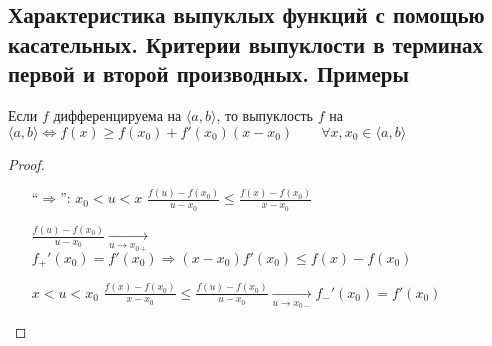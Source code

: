 \subsection{Характеристика выпуклых функций с помощью касательных. Критерии выпуклости в терминах первой и второй производных. Примеры \href{https://youtu.be/CAxh8kYEOlQ?t=6210}{\Walley}}
\begin{theorem-non}
    Если $f$ дифференцируема на $\langle a, b \rangle$, то выпуклость $f$ на $\langle a, b \rangle \Longleftrightarrow
    f(x) \geqslant f(x_0) + f'(x_0)(x - x_0) \qquad \forall x, x_0 \in \langle a, b \rangle $


    \begin{proof} \quad 

        \begin{itemize}
            \item[``$\Longrightarrow$'':] $x_0 < u < x$ \qquad 
            $\frac{f(u) - f(x_0)}{u - x_0} \leqslant \frac{f(x) - f(x_0)}{x - x_0}$

            $\frac{f(u) - f(x_0)}{u - x_0} \underset{u \rightarrow x_{0+}}{\longrightarrow}$
            $f_{+}'(x_0) = f'(x_0) \Longrightarrow (x - x_0)f'(x_0) \leqslant f(x) - f(x_0)$

            $x < u < x_0$ \qquad 
            $\frac{f(x) - f(x_0)}{x - x_0} \leqslant \frac{f(u) - f(x_0)}{u - x_0}
            \underset{u \rightarrow x_{0-}}{\longrightarrow}
            f_{-}'(x_0) = f'(x_0)$
            

\end{itemize}
\end{proof}
\end{theorem-non}

